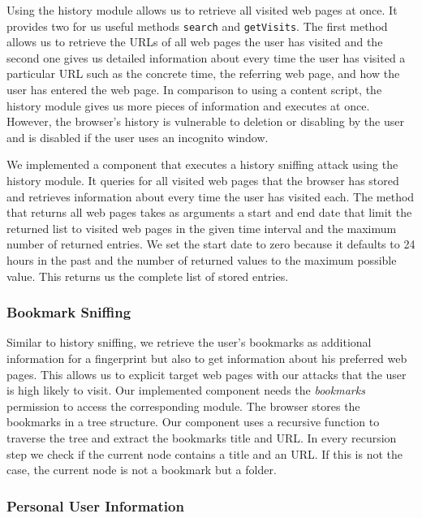 	Using the history module allows us to retrieve all visited web pages at once. It provides two for us useful methods \texttt{search} and \texttt{getVisits}. The first method allows us to retrieve the URLs of all web pages the user has visited and the second one gives us detailed information about every time the user has visited a particular URL such as the concrete time, the referring web page, and how the user has entered the web page. In comparison to using a content script, the history module gives us more pieces of information and executes at once. However, the browser's history is vulnerable to deletion or disabling by the user and is disabled if the user uses an incognito window.
	
	We implemented a component that executes a history sniffing attack using the history module. It queries for all visited web pages that the browser has stored and retrieves information about every time the user has visited each. The method that returns all web pages takes as arguments a start and end date that limit the returned list to visited web pages in the given time interval and the maximum number of returned entries. We set the start date to zero because it defaults to 24 hours in the past and the number of returned values to the maximum possible value. This returns us the complete list of stored entries.
	
\subsubsection{Bookmark Sniffing}
\label{sec:bookmarkSniffing}

	Similar to history sniffing, we retrieve the user's bookmarks as additional information for a fingerprint but also to get information about his preferred web pages. This allows us to explicit target web pages with our attacks that the user is high likely to visit. Our implemented component needs the \textit{bookmarks} permission to access the corresponding module. The browser stores the bookmarks in a tree structure. Our component uses a recursive function to traverse the tree and extract the bookmarks title and URL. In every recursion step we check if the current node contains a title and an URL. If this is not the case, the current node is not a bookmark but a folder.

\subsubsection{Personal User Information}
\label{sec:personalUserInformation}
	
